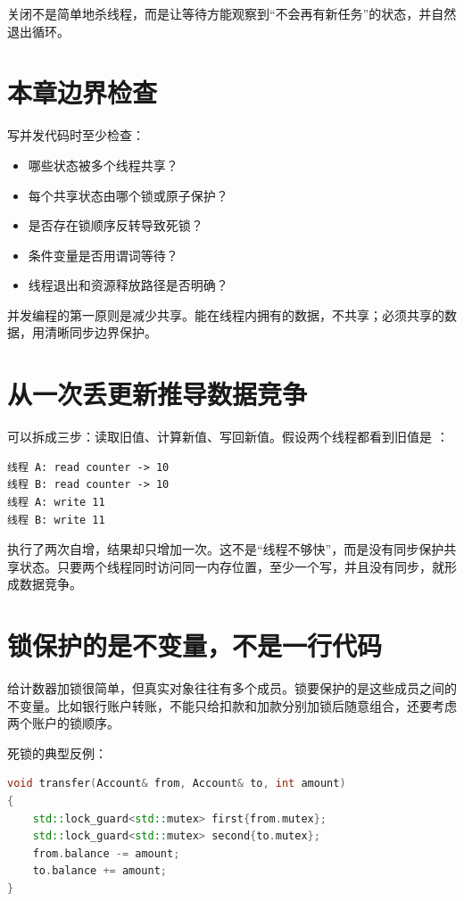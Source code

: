 关闭不是简单地杀线程，而是让等待方能观察到“不会再有新任务”的状态，并自然退出循环。

\section{本章边界检查}

写并发代码时至少检查：

\begin{itemize}
  \item 哪些状态被多个线程共享？
  \item 每个共享状态由哪个锁或原子保护？
  \item 是否存在锁顺序反转导致死锁？
  \item 条件变量是否用谓词等待？
  \item 线程退出和资源释放路径是否明确？
\end{itemize}

\begin{keyidea}
并发编程的第一原则是减少共享。能在线程内拥有的数据，不共享；必须共享的数据，用清晰同步边界保护。
\end{keyidea}

\section{从一次丢更新推导数据竞争}

 可以拆成三步：读取旧值、计算新值、写回新值。假设两个线程都看到旧值是 ：

\begin{lstlisting}[caption={一次丢更新的交错过程}]
线程 A: read counter -> 10
线程 B: read counter -> 10
线程 A: write 11
线程 B: write 11
\end{lstlisting}

执行了两次自增，结果却只增加一次。这不是“线程不够快”，而是没有同步保护共享状态。只要两个线程同时访问同一内存位置，至少一个写，并且没有同步，就形成数据竞争。

\section{锁保护的是不变量，不是一行代码}

给计数器加锁很简单，但真实对象往往有多个成员。锁要保护的是这些成员之间的不变量。比如银行账户转账，不能只给扣款和加款分别加锁后随意组合，还要考虑两个账户的锁顺序。

死锁的典型反例：

\begin{lstlisting}[language=C++,caption={锁顺序反转可能死锁}]
void transfer(Account& from, Account& to, int amount)
{
    std::lock_guard<std::mutex> first{from.mutex};
    std::lock_guard<std::mutex> second{to.mutex};
    from.balance -= amount;
    to.balance += amount;
}
\end{lstlisting}

